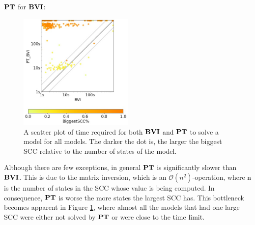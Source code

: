 $\TOPAlg$ for $\BVI$:
\begin{figure}[h!]
    \centering
    \includegraphics[width=0.5\textwidth]{figures/colorScatter_BVI_TOP.jpg}
    \caption[$\BVI$ compared to $\TOPAlg$]{
        A scatter plot of time required for both $\BVI$ and $\TOPAlg$ to solve a model for all models.
        The darker the dot is, the larger the biggest SCC relative to the number of states of the model.
    }
    \label{fig:colorScatterBviTop}
\end{figure}
\FloatBarrier

Although there are few exceptions, in general $\TOPAlg$ is significantly slower than $\BVI$.
This is due to the matrix inversion, which is an $\mathcal{O}(n^{2})$-operation, where n is the number of states in the SCC whose value is being computed.
In consequence, $\TOPAlg$ is worse the more states the largest SCC has. This bottleneck becomes apparent in Figure \ref{fig:colorScatterBviTop}, 
where almost all the models that had one large SCC were either not solved by $\TOPAlg$ or were close to the time limit. 


